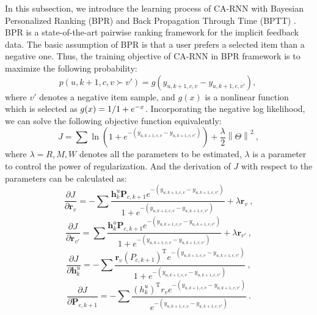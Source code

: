 \documentclass{sig-alternate}
\begin{document}
In this subsection, we introduce the learning process of CA-RNN with Bayesian Personalized Ranking (BPR) \cite{rendle2009bpr} and Back Propagation Through Time (BPTT) \cite{rumelhart1988learning}.
BPR is a state-of-the-art pairwise ranking framework for the implicit feedback data. The basic assumption of BPR is that a user prefers a selected item than a negative one. Thus, the training objective of CA-RNN in BPR framework is to maximize the following probability:
\begin{equation}
p(u, k+1, c, v\succ v') = g(y_{u, k+1, c, v} - y_{u, k+1, c, v'}),~
\end{equation}
where $v'$ denotes a negative item sample, and $g(x)$ is a nonlinear function which is selected as $g(x) = {1 \mathord{\left/ \right. \kern-\nulldelimiterspace} 1 + e^{ - x}}$. Incorporating the negative log likelihood, we can solve the following objective function equivalently:
\begin{equation}
J = \sum \ln(1+e^{-(y_{u,k+1,c,v} - y_{u,k+1,c,v'})})+\frac{\lambda }{2}\left \| \Theta  \right \|^{2}  ~,
\end{equation}
where $\lambda = {R, M ,W}$ denotes all the parameters to be estimated, $\lambda$ is a parameter to control the power of regularization. And the derivation of $J$ with respect to the parameters can be calculated as: 
\begin{displaymath}
\frac{\partial J}{\partial \mathbf{r}_{v}} = -\sum \frac{\mathbf{h}_{k}^{u}\mathbf{P}_{c,k+1}e^{-(y_{u, k+1, c, v} - y_{u, k+1, c, v'})}}{1+e^{-(y_{u, k+1, c, v} - y_{u, k+1, c, v'})}}+\lambda \mathbf{r}_{v}  ~,
\end{displaymath}
\begin{displaymath}
\frac{\partial J}{\partial \mathbf{r}_{v'}} = \sum \frac{\mathbf{h}_{k}^{u}\mathbf{P}_{c,k+1}e^{-(y_{u, k+1, c, v} - y_{u, k+1, c, v'})}}{1+e^{-(y_{u, k+1, c, v} - y_{u, k+1, c, v'})}}+\lambda \mathbf{r}_{v'}  ~,
\end{displaymath}
\begin{displaymath}
\frac{\partial J}{\partial \mathbf{h}_{k}^{u}} = -\sum \frac{\mathbf{r}_{v}(P_{c,k+1})^{\mathrm{ T }}e^{-(y_{u, k+1, c, v} - y_{u, k+1, c, v'})}}{1+e^{-(y_{u, k+1, c, v} - y_{u, k+1, c, v'})}}   ~,
\end{displaymath}
\begin{displaymath}
\frac{\partial J}{\partial \mathbf{P}_{c,k+1}} = -\sum \frac{(h_{k}^{u})^{\mathrm T}r_{v}e^{-(y_{u, k+1, c, v} - y_{u, k+1, c, v'})}
}{e^{-(y_{u, k+1, c, v} - y_{u, k+1, c, v'})}}    ~.
\end{displaymath}
\end{document}
